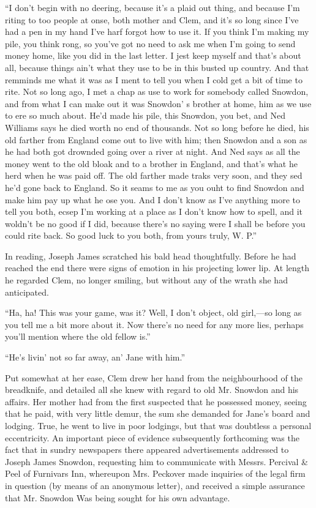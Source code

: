 ``I don't begin with no deering, because it's a plaid out thing, and
because I'm riting to too people at onse, both mother and Clem, and it's
so long since I've had a pen in my hand I've harf forgot how to use it.
If you think I'm making my pile, you think rong, so you've got no need
to ask me when I'm going to send money home, like you did in the last
letter. I jest keep myself and that's about all, because things ain't
what they use to be {}in this busted up country. And that remminds me
what it was as I ment to tell you when I cold get a bit of time to rite.
Not so long ago, I met a chap as use to work for somebody called
Snowdon, and from what I can make out it was Snowdon' s brother at home,
him as we use to ere so much about. He'd made his pile, this Snowdon,
you bet, and Ned Williams says he died worth no end of thousands. Not so
long before he died, his old farther from England come out to live with
him; then Snowdon and a son as he had both got drownded going over a
river at night. And Ned says as all the money went to the old bloak and
to a brother in England, and that's what he herd when he was paid off.
The old farther made traks very soon, and they sed he'd gone back to
England. So it seams to me as you ouht to find Snowdon and make him pay
up what he ose you. And I don't know as I've anything more to tell you
both, ecsep I'm working at a place as I don't know how to spell, and it
woldn't be no good if I did, because there's no saying were I {}shall be
before you could rite back. So good luck to you both, from yours truly,
W. P.''

In reading, Joseph James scratched his bald head thoughtfully. Before he
had reached the end there were signs of emotion in his projecting lower
lip. At length he regarded Clem, no longer smiling, but without any of
the wrath she had anticipated.

``Ha, ha! This was your game, was it? Well, I don't object, old
girl,---so long as you tell me a bit more about it. Now there's no need
for any more lies, perhaps you'll mention where the old fellow is.''

``He's livin' not so far away, an' Jane with him.''

Put somewhat at her ease, Clem drew her hand from the neighbourhood of
the breadknife, and detailed all she knew with regard to old Mr. Snowdon
and his affairs. Her mother had from the first suspected that he
possessed money, seeing that he paid, with very little demur, the sum
she demanded for Jane's board and lodging. True, he went to live in poor
lodgings, but that was doubtless a {}personal eccentricity. An important
piece of evidence subsequently forthcoming was the fact that in sundry
newspapers there appeared advertisements addressed to Joseph James
Snowdon, requesting him to communicate with Messrs. Percival \& Peel of
Furnivars Inn, whereupon Mrs. Peckover made inquiries of the legal firm
in question (by means of an anonymous letter), and received a simple
assurance that Mr. Snowdon Was being sought for his own advantage.

